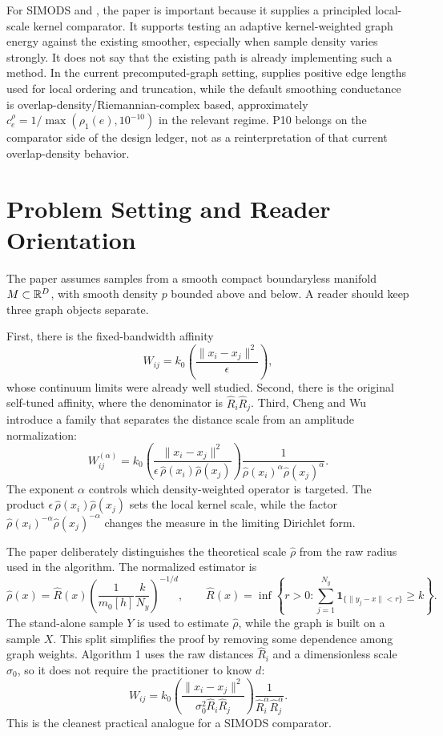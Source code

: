 \documentclass[11pt]{article}
\begin{document}
For SIMODS and , the paper is important because it supplies a
principled local-scale kernel comparator. It supports testing an adaptive
kernel-weighted graph energy against the existing smoother, especially when
sample density varies strongly. It does not say that the existing
 path is already implementing such a method.
In the current precomputed-graph setting,  supplies
positive edge lengths used for local ordering and truncation, while the
default smoothing conductance is overlap-density/Riemannian-complex based,
approximately \(c_e^\rho=1/\max(\rho_1(e),10^{-10})\) in the relevant regime.
P10 belongs on the comparator side of the design ledger, not as a
reinterpretation of that current overlap-density behavior.

\section{Problem Setting and Reader Orientation}

The paper assumes samples from a smooth compact boundaryless manifold
\(M\subset\mathbb{R}^D\), with smooth density \(p\) bounded above and below. A reader
should keep three graph objects separate.

First, there is the fixed-bandwidth affinity
\[
  W_{ij}=k_0\!\left(\frac{\|x_i-x_j\|^2}{\epsilon}\right),
\]
whose continuum limits were already well studied. Second, there is the
original self-tuned affinity, where the denominator is
\(\widehat R_i\widehat R_j\). Third, Cheng and Wu introduce a family that
separates the distance scale from an amplitude normalization:
\[
  W_{ij}^{(\alpha)}
  =
  k_0\!\left(
    \frac{\|x_i-x_j\|^2}
         {\epsilon\,\widehat\rho(x_i)\widehat\rho(x_j)}
  \right)
  \frac{1}{\widehat\rho(x_i)^\alpha\widehat\rho(x_j)^\alpha}.
\]
The exponent \(\alpha\) controls which density-weighted operator is targeted.
The product
\(\epsilon\,\widehat\rho(x_i)\widehat\rho(x_j)\) sets the local kernel scale,
while the factor
\(\widehat\rho(x_i)^{-\alpha}\widehat\rho(x_j)^{-\alpha}\) changes the
measure in the limiting Dirichlet form.

The paper deliberately distinguishes the theoretical scale
\(\widehat\rho\) from the raw radius used in the algorithm. The normalized
estimator is
\[
  \widehat\rho(x)
  =
  \widehat R(x)
  \left(\frac{1}{m_0[h]}\frac{k}{N_y}\right)^{-1/d},
  \qquad
  \widehat R(x)
  =
  \inf\left\{r>0:
    \sum_{j=1}^{N_y}\mathbf{1}_{\{\|y_j-x\|<r\}}\ge k
  \right\}.
\]
The stand-alone sample \(Y\) is used to estimate \(\widehat\rho\), while the
graph is built on a sample \(X\). This split simplifies the proof by removing
some dependence among graph weights. Algorithm 1 uses the raw distances
\(\widehat R_i\) and a dimensionless scale \(\sigma_0\), so it does not
require the practitioner to know \(d\):
\[
  W_{ij}
  =
  k_0\!\left(\frac{\|x_i-x_j\|^2}{\sigma_0^2\widehat R_i\widehat R_j}\right)
  \frac{1}{\widehat R_i^\alpha\widehat R_j^\alpha}.
\]
This is the cleanest practical analogue for a SIMODS comparator.
\end{document}
